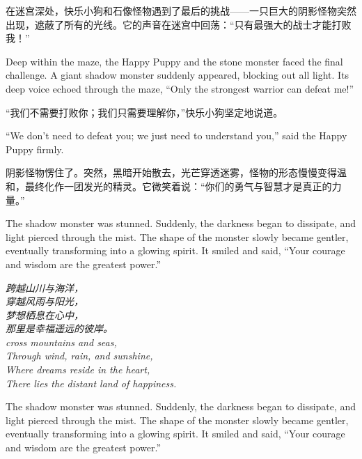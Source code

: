 在迷宫深处，快乐小狗和石像怪物遇到了最后的挑战——一只巨大的阴影怪物突然出现，遮蔽了所有的光线。它的声音在迷宫中回荡：“只有最强大的战士才能打败我！”

\begin{flushright}
Deep within the maze, the Happy Puppy and the stone monster faced the final challenge. A giant shadow monster suddenly appeared, blocking out all light. Its deep voice echoed through the maze, “Only the strongest warrior can defeat me!”
\end{flushright}

“我们不需要打败你；我们只需要理解你，”快乐小狗坚定地说道。

\begin{flushright}
“We don’t need to defeat you; we just need to understand you,” said the Happy Puppy firmly.
\end{flushright}

阴影怪物愣住了。突然，黑暗开始散去，光芒穿透迷雾，怪物的形态慢慢变得温和，最终化作一团发光的精灵。它微笑着说：“你们的勇气与智慧才是真正的力量。”

\begin{flushright}
The shadow monster was stunned. Suddenly, the darkness began to dissipate, and light pierced through the mist. The shape of the monster slowly became gentler, eventually transforming into a glowing spirit. It smiled and said, “Your courage and wisdom are the greatest power.”
\end{flushright}

\begin{center}
    \textit{
    跨越山川与海洋，\\
    穿越风雨与阳光，\\
    梦想栖息在心中，\\
    那里是幸福遥远的彼岸。 \\
    cross mountains and seas,\\
    Through wind, rain, and sunshine,\\
    Where dreams reside in the heart,\\
    There lies the distant land of happiness.
    }
    \end{center}

\begin{flushright}
The shadow monster was stunned. Suddenly, the darkness began to dissipate, and light pierced through the mist. The shape of the monster slowly became gentler, eventually transforming into a glowing spirit. It smiled and said, “Your courage and wisdom are the greatest power.”
\end{flushright}

